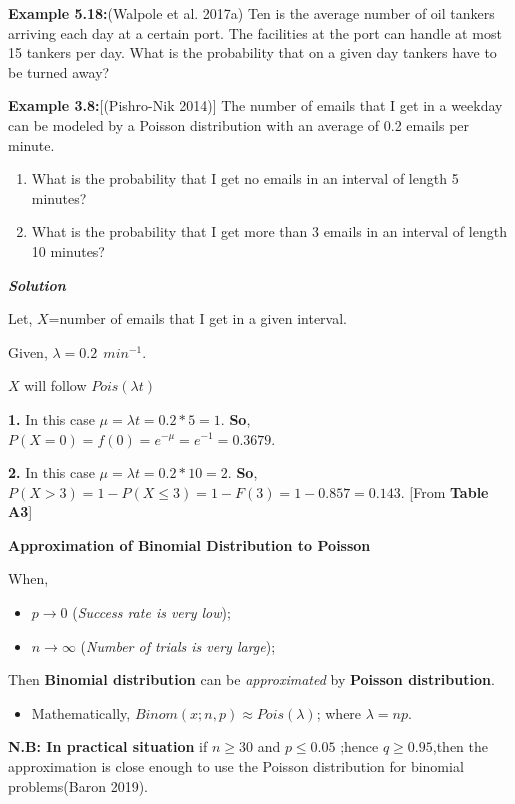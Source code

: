 \documentclass[
  11pt,
  letterpaper,
  DIV=11,
  numbers=noendperiod]{scrreprt}
\providecommand{\tightlist}{%
  \setlength{\itemsep}{0pt}\setlength{\parskip}{0pt}}
\begin{document}
\textbf{Example 5.18:}(Walpole et al. 2017a) Ten is the average number
of oil tankers arriving each day at a certain port. The facilities at
the port can handle at most 15 tankers per day. What is the probability
that on a given day tankers have to be turned away?

\textbf{Example 3.8:}{[}(Pishro-Nik 2014){]} The number of emails that I
get in a weekday can be modeled by a Poisson distribution with an
average of 0.2 emails per minute.

\begin{enumerate}
\def\labelenumi{\arabic{enumi}.}
\item
  What is the probability that I get no emails in an interval of length
  5 minutes?
\item
  What is the probability that I get more than 3 emails in an interval
  of length 10 minutes?
\end{enumerate}

\textbf{\emph{Solution}}

Let, \(X\)=number of emails that I get in a given interval.

Given, \(\lambda =0.2 \ \ min^{-1}\).

\(X\) will follow \(Pois(\lambda t)\)

\textbf{1.} In this case \(\mu=\lambda t=0.2*5=1\). \textbf{So},
\(P(X=0)=f(0)=e^{-\mu}=e^{-1}=0.3679\).

\textbf{2.} In this case \(\mu=\lambda t=0.2*10=2\).
\textbf{So},\(P(X>3)=1-P(X\le 3)=1-F(3)=1-0.857=0.143\). {[}From
\textbf{Table A3}{]}

\textbf{Approximation of Binomial Distribution to Poisson}

When,

\begin{itemize}
\item
  \(p \rightarrow0\) (\emph{Success rate is very low});
\item
  \(n\rightarrow \infty\) (\emph{Number of trials is very large});
\end{itemize}

Then \textbf{Binomial distribution} can be \emph{approximated} by
\textbf{Poisson distribution}.

\begin{itemize}
\tightlist
\item
  Mathematically, \(Binom (x; n,p)\approx Pois(\lambda)\); where
  \(\lambda=np\).
\end{itemize}

\textbf{N.B: In practical situation} if \(n \ge 30\) and \(p\le 0.05\)
;hence \(q\ge 0.95\),then the approximation is close enough to use the
Poisson distribution for binomial problems(Baron 2019).
\end{document}
